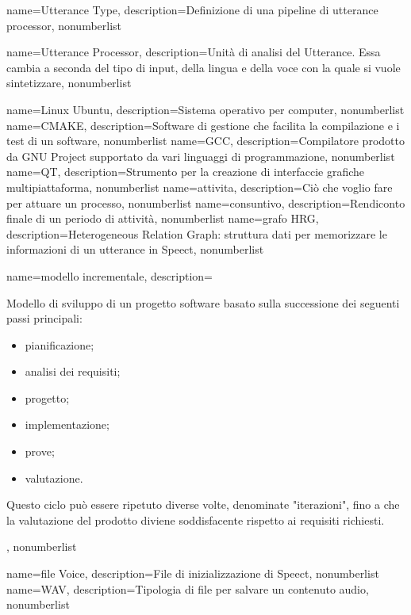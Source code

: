 {
name={Utterance Type},
description={Definizione di una pipeline di utterance processor},
nonumberlist
}

{
	name={Utterance Processor},
	description={Unità di analisi del Utterance. Essa cambia a seconda del tipo di input, della lingua e della voce con la quale si vuole sintetizzare},
	nonumberlist
}

{
	name={Linux Ubuntu},
	description={Sistema operativo per computer},
	nonumberlist
}
{
	name={CMAKE},
	description={Software di gestione che facilita la compilazione e i test di un software},
	nonumberlist
}
{
	name={GCC},
	description={Compilatore prodotto da GNU Project supportato da vari linguaggi di programmazione},
	nonumberlist
}
{
	name={QT},
	description={Strumento per la creazione di interfaccie grafiche multipiattaforma},
	nonumberlist
}
{
	name={attivita},
	description={Ciò che voglio fare per attuare un processo},
	nonumberlist
}
{
	name={consuntivo},
	description={Rendiconto finale di un periodo di attività},
	nonumberlist
}
{
	name={grafo HRG},
	description={Heterogeneous Relation Graph: struttura dati per memorizzare le informazioni di un utterance in Speect},
	nonumberlist
}
{
	name={modello incrementale},
	description={Modello di sviluppo di un progetto software basato sulla successione dei seguenti passi principali:
	\begin{itemize}
    	\item pianificazione;
    	\item analisi dei requisiti;
   		\item progetto;
   		\item implementazione;
   		\item prove;
   		\item valutazione.
	\end{itemize}
	Questo ciclo può essere ripetuto diverse volte, denominate "iterazioni", fino a che la valutazione del prodotto diviene soddisfacente rispetto ai requisiti richiesti.},
	nonumberlist
}
{
	name={file Voice},
	description={File di inizializzazione di Speect},
	nonumberlist
}
{
	name={WAV},
	description={Tipologia di file per salvare un contenuto audio},
	nonumberlist
}

